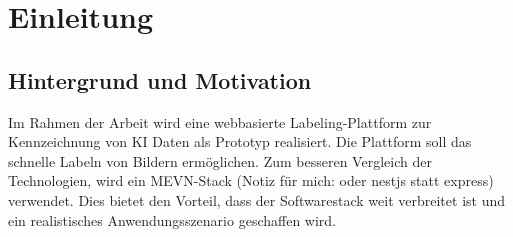 \chapter{Einleitung}\label{chap:introduction}
\section{Hintergrund und Motivation}\label{sec:introduction-background-and-motiviation}

Im Rahmen der Arbeit wird eine webbasierte Labeling-Plattform zur Kennzeichnung von KI Daten als Prototyp realisiert. Die Plattform soll das schnelle Labeln von Bildern ermöglichen. Zum besseren Vergleich der Technologien, wird ein MEVN-Stack (Notiz für mich: oder nestjs statt express) verwendet. Dies bietet den Vorteil, dass der Softwarestack weit verbreitet ist und ein realistisches Anwendungsszenario geschaffen wird.